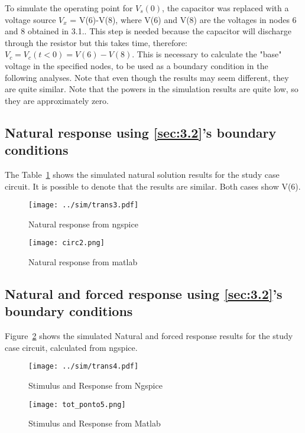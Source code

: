 To simulate the operating point for $V_s(0)$, the capacitor was replaced with a voltage source $V_x$ = V(6)-V(8), where V(6) and V(8) are the voltages in nodes 6 and 8 obtained in 3.1.. This step is needed because the capacitor will discharge through the resistor but this takes time, therefore: $V_c=V_c(t<0)=V(6)-V(8)$. This is necessary to calculate the "base" voltage in the specified nodes, to be used as a boundary condition in the following analyses. Note that even though the results may seem different, they are quite similar. Note that the powers in the simulation results are quite low, so they are approximately zero.

\vspace{0.5cm}
\subsection{Natural response using \ref{sec:3.2}'s boundary conditions }

The Table~\ref{fig:trans3} shows the simulated natural solution results for the study case circuit. It is possible to denote that the results are similar. Both cases show V(6).

\begin{figure}[!htb]
      \texttt{[image: ../sim/trans3.pdf]}
      \caption{Natural response from ngspice}
      \label{fig:trans3}
    \endminipage\hfill
      \texttt{[image: circ2.png]} %
      \caption{Natural response from matlab}
      
    \endminipage\hfill
\end{figure}




\subsection{Natural and forced response using \ref{sec:3.2}'s boundary conditions }

Figure~\ref{fig:trans4} shows the simulated  Natural and forced response results for the study case circuit, calculated from ngspice.

\begin{figure}[!htb] \centering
      \texttt{[image: ../sim/trans4.pdf]}
      \caption{Stimulus and Response from Ngspice}
      \label{fig:trans4}
    \endminipage\hfill
      \texttt{[image: tot\_ponto5.png]} %
      \caption{Stimulus and Response from Matlab}
    \endminipage\hfill
\end{figure}



